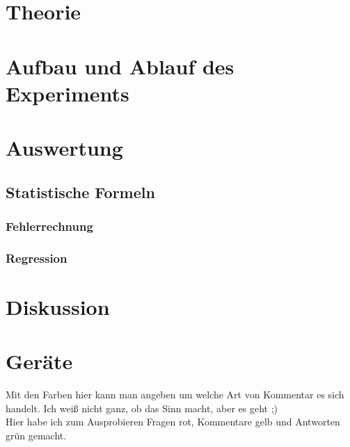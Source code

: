 \documentclass[a4,12pt]{article}
\begin{document}



\tableofcontents
\newpage


\section{Theorie}

\newpage


\section{Aufbau und Ablauf des Experiments}

\clearpage


\section{Auswertung}
\subsection{Statistische Formeln}
\subsubsection{Fehlerrechnung}
\label{sec:Fehlerrechnung}

\subsubsection{Regression}
\label{sec:regression}

\clearpage

\clearpage


\section{Diskussion}



\section{Geräte}

\todototoc
\listoftodos
Mit den Farben hier kann man angeben um welche Art von Kommentar es sich handelt. Ich weiß nicht ganz, ob das Sinn macht, aber es geht ;) \\
Hier habe ich zum Ausprobieren Fragen rot, Kommentare gelb und Antworten grün gemacht.
\end{document}
